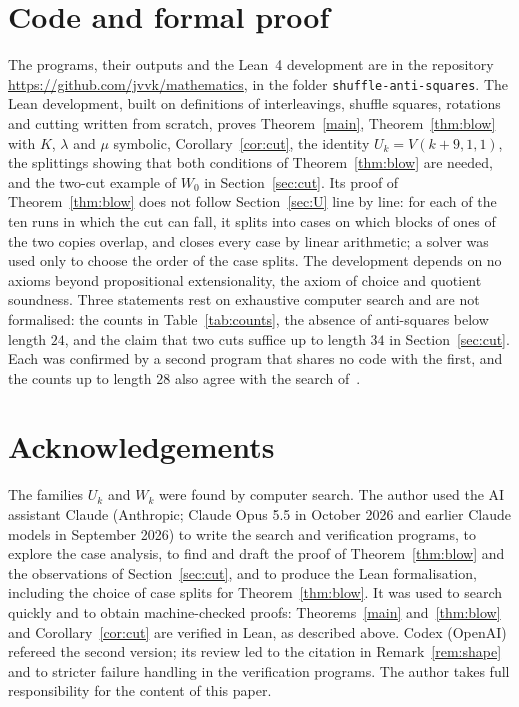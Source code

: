 \documentclass[12pt]{article}
\begin{document}
\section*{Code and formal proof}
The programs, their outputs and the Lean~4 development are in the repository
\url{https://github.com/jvvk/mathematics}, in the folder \texttt{shuffle-anti-squares}. The Lean development, built on definitions of
interleavings, shuffle squares, rotations and cutting written from scratch, proves Theorem~\ref{main},
Theorem~\ref{thm:blow} with $K$, $\lambda$ and $\mu$ symbolic, Corollary~\ref{cor:cut}, the identity
$U_k = V(k+9,1,1)$, the splittings showing that both conditions of Theorem~\ref{thm:blow} are needed, and the
two-cut example of $W_0$ in Section~\ref{sec:cut}. Its proof of Theorem~\ref{thm:blow} does not follow
Section~\ref{sec:U} line by line: for each of the ten runs in which the cut can fall, it splits into cases on
which blocks of ones of the two copies overlap, and closes every case by linear arithmetic; a solver was used
only to choose the order of the case splits. The development depends on no axioms beyond propositional
extensionality, the axiom of choice and quotient soundness. Three statements rest on exhaustive computer search
and are not formalised: the counts in Table~\ref{tab:counts}, the absence of anti-squares below length $24$,
and the claim that two cuts suffice up to length $34$ in Section~\ref{sec:cut}. Each was confirmed by a second program that shares no code with the first, and the
counts up to length $28$ also agree with the search of~\cite{GPP}.

\section*{Acknowledgements}
The families $U_k$ and $W_k$ were found by computer search. The author used the AI assistant Claude
(Anthropic; Claude Opus 5.5 in October 2026 and earlier Claude models in September 2026) to write the search
and verification programs, to explore the case analysis, to find and draft the proof of
Theorem~\ref{thm:blow} and the observations of Section~\ref{sec:cut}, and to produce the Lean formalisation,
including the choice of case splits for Theorem~\ref{thm:blow}. It was used to search quickly and to obtain
machine-checked proofs: Theorems~\ref{main} and~\ref{thm:blow} and Corollary~\ref{cor:cut} are verified in
Lean, as described above. Codex (OpenAI) refereed the second version; its review led to the citation in
Remark~\ref{rem:shape} and to stricter failure handling in the verification programs. The author takes full
responsibility for the content of this paper.
\end{document}
